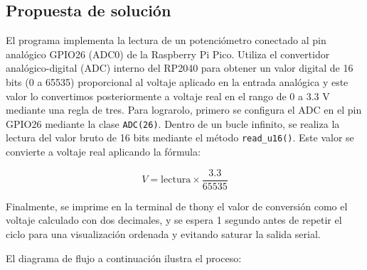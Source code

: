 \documentclass[letterpaper,12pt]{article}
\begin{document}
\begin{figure}[htbp]
\end{figure}


\subsection*{Propuesta de solución}

El programa implementa la lectura de un potenciómetro conectado al pin analógico GPIO26 (ADC0) de la Raspberry Pi Pico. Utiliza el convertidor analógico-digital (ADC) interno del RP2040 para obtener un valor digital de 16 bits (0 a 65535) proporcional al voltaje aplicado en la entrada analógica y este valor lo convertimos posteriormente a voltaje real en el rango de 0 a 3.3 V mediante una regla de tres. Para lograrolo, primero se configura el ADC en el pin GPIO26 mediante la clase \texttt{ADC(26)}. Dentro de un bucle infinito, se realiza la lectura del valor bruto de 16 bits mediante el método \texttt{read\_u16()}. Este valor se convierte a voltaje real aplicando la fórmula:

\[
V = \text{lectura} \times \frac{3.3}{65535}
\]

Finalmente, se imprime en la terminal de thony el valor de conversión como el voltaje calculado con dos decimales, y se espera 1 segundo antes de repetir el ciclo para una visualización ordenada y evitando saturar la salida serial.

El diagrama de flujo a continuación ilustra el proceso:
\end{document}

